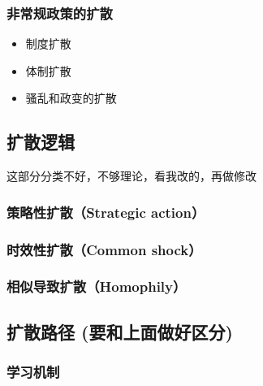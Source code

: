 \documentclass[
  12pt,
]{ctexart}
\begin{document}
\hypertarget{ux975eux5e38ux89c4ux653fux7b56ux7684ux6269ux6563}{%
\subsubsection{非常规政策的扩散}\label{ux975eux5e38ux89c4ux653fux7b56ux7684ux6269ux6563}}

\begin{itemize}
\item
  制度扩散
\item
  体制扩散
\item
  骚乱和政变的扩散
\end{itemize}

\hypertarget{ux6269ux6563ux903bux8f91}{%
\subsection{扩散逻辑}\label{ux6269ux6563ux903bux8f91}}

这部分分类不好，不够理论，看我改的，再做修改

\hypertarget{ux7b56ux7565ux6027ux6269ux6563strategic-action}{%
\subsubsection{策略性扩散（Strategic action）}\label{ux7b56ux7565ux6027ux6269ux6563strategic-action}}

\hypertarget{ux65f6ux6548ux6027ux6269ux6563common-shock}{%
\subsubsection{时效性扩散（Common shock）}\label{ux65f6ux6548ux6027ux6269ux6563common-shock}}

\hypertarget{ux76f8ux4f3cux5bfcux81f4ux6269ux6563homophily}{%
\subsubsection{相似导致扩散（Homophily）}\label{ux76f8ux4f3cux5bfcux81f4ux6269ux6563homophily}}

\hypertarget{ux6269ux6563ux8defux5f84-ux8981ux548cux4e0aux9762ux505aux597dux533aux5206}{%
\subsection{扩散路径 (要和上面做好区分)}\label{ux6269ux6563ux8defux5f84-ux8981ux548cux4e0aux9762ux505aux597dux533aux5206}}

\hypertarget{ux5b66ux4e60ux673aux5236}{%
\subsubsection{学习机制}\label{ux5b66ux4e60ux673aux5236}}
\end{document}
